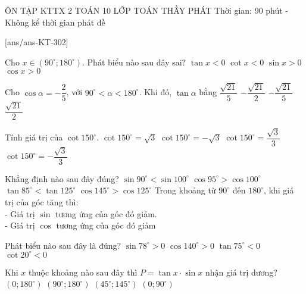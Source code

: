 \begin{name}
	{ÔN TẬP KTTX 2}
	{TOÁN 10}
	{LỚP TOÁN THẦY PHÁT}
	{Thời gian: 90 phút - Không kể thời gian phát đề}
\end{name}
\TN
\setcounter{ex}{0}\setcounter{ex}{0}
[ans/ans-KT-302]
\begin{ex} 
	Cho $x\in(90^\circ;180^\circ)$. Phát biểu nào sau đây sai?
	\choice
	{$\tan x<0$}
	{$\cot x<0$}
	{$\sin x>0$}
	{\True $\cos x>0$}
\end{ex}
\begin{ex}
	Cho $\cos\alpha=-\dfrac{2}{5}$, với $90^\circ<\alpha<180^\circ$. Khi đó, $\tan\alpha$ bằng
	\choice
	{$\dfrac{\sqrt{21}}{5}$}
	{\True $-\dfrac{\sqrt{21}}{2}$}
	{$-\dfrac{\sqrt{21}}{5}$}
	{$\dfrac{\sqrt{21}}{2}$}
\end{ex}
\begin{ex}
	Tính giá trị của $\cot150^\circ$.
	\choice
	{$\cot150^\circ=\sqrt{3}$}
	{\True $\cot150^\circ=-\sqrt{3}$}
	{$\cot150^\circ=\dfrac{\sqrt{3}}{3}$}
	{$\cot150^\circ=-\dfrac{\sqrt{3}}{3}$}
\end{ex}
\begin{ex}
	Khẳng định nào sau đây đúng?
	\choice
	{$\sin 90^\circ<\sin 100^\circ$}
	{\True $\cos 95^\circ>\cos 100^\circ$}
	{$\tan 85^\circ<\tan 125^\circ$}
	{$\cos 145^\circ>\cos 125^\circ$}
	\loigiai
	{Trong khoảng từ $90^\circ$ đến $180^\circ$, khi giá trị của góc tăng thì:\\
		- Giá trị $\sin$ tương ứng của góc đó giảm.\\
		- Giá trị $\cos$ tương ứng của góc đó giảm}
\end{ex}
\begin{ex}
	Phát biểu nào sau đây là đúng?
	\choice
	{\True $\sin78^\circ>0$}
	{$\cos 140^\circ>0$}
	{$\tan75^\circ<0$}
	{ $\cot20^\circ<0$}
\end{ex}
\begin{ex} 
	Khi $x$ thuộc khoảng nào sau đây thì $P=\tan x\cdot\sin x$ nhận giá trị dương?
	\choice
	{$\left(0;180^\circ\right)$}
	{$\left(90^\circ;180^\circ\right)$}
	{$\left(45^\circ;145^\circ\right)$}
	{\True $\left(0;90^\circ\right)$}
\end{ex}
